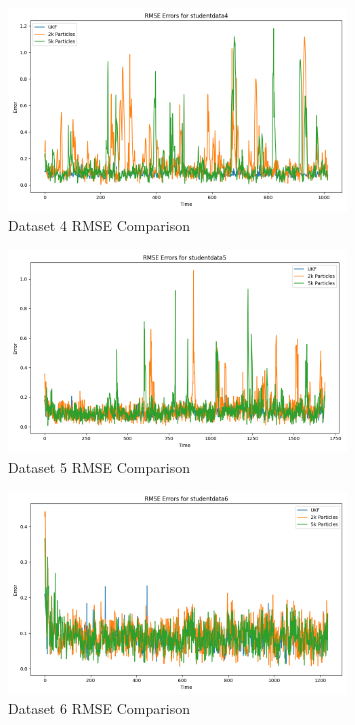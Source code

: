 \documentclass{article}
\begin{document}
\begin{figure}[H]
    \centering
    \includegraphics[width=0.8\textwidth]{./imgs/task3/studentdata4_rmse.png}
    \caption{Dataset 4 RMSE Comparison}
\end{figure}

\begin{figure}[H]
    \centering
    \includegraphics[width=0.8\textwidth]{./imgs/task3/studentdata5_rmse.png}
    \caption{Dataset 5 RMSE Comparison}
\end{figure}

\begin{figure}[H]
    \centering
    \includegraphics[width=0.8\textwidth]{./imgs/task3/studentdata6_rmse.png}
    \caption{Dataset 6 RMSE Comparison}
\end{figure}
\end{document}
